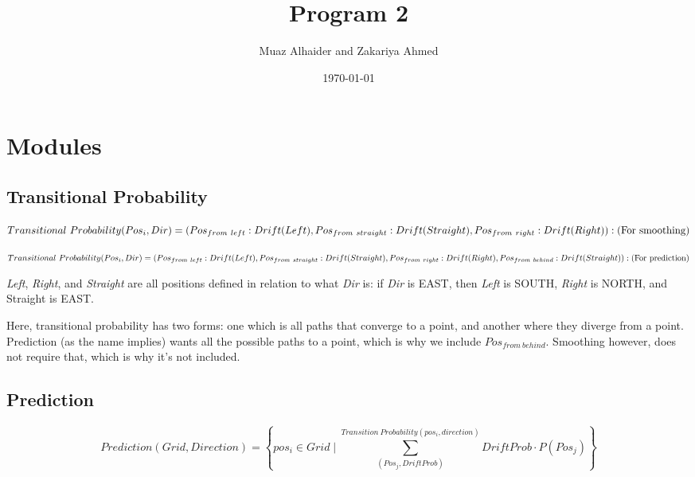 \documentclass[11pt]{article}
\author{Muaz Alhaider and Zakariya Ahmed}
\date{\today}
\title{Program 2}
\begin{document}
\maketitle

\section*{Modules}
\label{sec:org14bc464}

\subsection*{Transitional Probability}
\label{sec:orgfa5aaa4}
   \begin{math}
    Transitional\ Probability(Pos_i, Dir) = \\
     (Pos_{from\ left}:Drift(Left), Pos_{from\ straight}:Drift(Straight), Pos_{from\ right}:Drift(Right)): (\text{For smoothing})
\end{math}

\newline
\begin{math}
\\ \\
Transitional\ Probability(Pos_i, Dir) =\\ (Pos_{from\ left}:Drift(Left), Pos_{from\ straight}:Drift(Straight), Pos_{from\ right}:Drift(Right), Pos_{from\ behind}:Drift(Straight)): (\text{For prediction})
\\ \\
\end{math}


\emph{Left}, \emph{Right}, and \emph{Straight} are all positions defined in relation to what \emph{Dir} is: if \emph{Dir} is EAST, then \emph{Left} is SOUTH, \emph{Right} is NORTH, and Straight is EAST.

Here, transitional probability has two forms: one which is all paths that converge to a point, and another where they diverge from a point. Prediction (as the name implies) wants all the possible paths to a point, which is why we include \(Pos_{from\ behind}\). Smoothing however, does not require that, which is why it's not included.


\subsection*{Prediction}
\label{sec:org6bf8055}
$$Prediction(Grid, Direction) = \left\{pos_i \in Grid \mid \sum^{Transition\ Probability(pos_i, direction)}_{(Pos_j, DriftProb)} DriftProb \cdot P(Pos_j) \right \}$$
\end{document}

